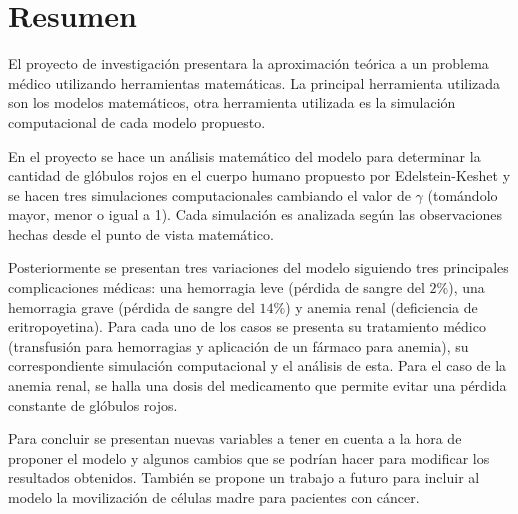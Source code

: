 \chapter*{Resumen}

El proyecto de investigación presentara la aproximación teórica a un problema médico utilizando herramientas matemáticas. La principal herramienta utilizada son los modelos matemáticos, otra herramienta utilizada es la simulación computacional de cada modelo propuesto.

En el proyecto se hace un análisis matemático del modelo para determinar la cantidad de glóbulos rojos en el cuerpo humano propuesto por Edelstein-Keshet y se hacen tres simulaciones computacionales cambiando el valor de $\gamma$ (tomándolo mayor, menor o igual a 1). Cada simulación es analizada según las observaciones hechas desde el punto de vista matemático. 

Posteriormente se presentan tres variaciones del modelo siguiendo tres principales complicaciones médicas: una hemorragia leve (pérdida de sangre del $2\%$), una hemorragia grave (pérdida de sangre del $14\%$) y anemia renal (deficiencia de eritropoyetina). Para cada uno de los casos se presenta su tratamiento médico (transfusión para hemorragias y aplicación de un fármaco para anemia), su correspondiente simulación computacional y el análisis de esta. Para el caso de la anemia renal, se halla una dosis del medicamento que permite evitar una pérdida constante de glóbulos rojos. 

Para concluir se presentan nuevas variables a tener en cuenta a la hora de proponer el modelo y algunos cambios que se podrían hacer para modificar los resultados obtenidos. También se propone un trabajo a futuro para incluir al modelo la movilización de células madre para pacientes con cáncer.

